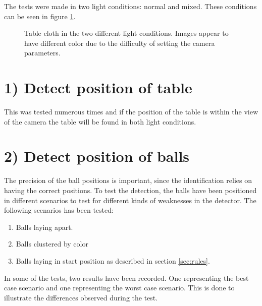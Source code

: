 The tests were made in two light conditions: normal and mixed. These conditions can be seen in figure \ref{fig:difflightcon}.

\begin{figure}[H]
  \centering
  \quad           
   \caption{Table cloth in the two different light conditions. Images appear to have different color due to the difficulty of setting the camera parameters.}
  \label{fig:difflightcon}
\end{figure}


\section{1) Detect position of table}

This was tested numerous times and if the position of the table is within the view of the camera the table will be found in both light conditions.

\section{2) Detect position of balls}
The precision of the ball positions is important, since the identification relies on having the correct positions. To test the detection, the balls have been positioned in different scenarios to test for different kinds of weaknesses in the detector. The following scenarios has been tested:
\begin{enumerate}
	\item Balls laying apart.
	\item Balls clustered by color
	\item Balls laying in start position as described in section \ref{sec:rules}.
\end{enumerate}
In some of the tests, two results have been recorded. One representing the best case scenario and one representing the worst case scenario. This is done to illustrate the differences observed during the test.

